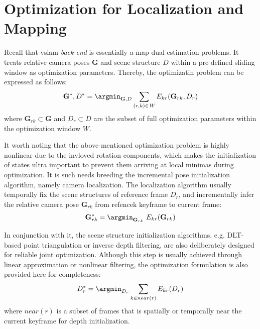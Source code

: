 \section{Optimization for Localization and Mapping}
\label{sec:preliminaries_locmap}
Recall that \acrshort{vslam} {\em back-end} is essentially a \acrshort{map} dual estimation problems. 
It treats relative camera poses $\mathbf{G}$ and scene structure $D$ within a pre-defined sliding window as optimization parameters.
Thereby, the optimizatin problem can be expressed as follows:
\begin{equation} \label{eq:preliminaries_mappingoptimization}
\mathbf{G}^*, D^* = \argmin_{\mathbf{G}, D} \sum_{(r,k)\in \mathit{W}} E_{kr}(\mathbf{G}_{rk}, D_r)
\end{equation} 
where $\mathbf{G}_{rk} \subset \mathbf{G}$ and $D_r \subset D$ are the subset of full optimization parameters within the optimization window $\mathit{W}$.

It worth noting that the above-mentioned optimization problem is highly nonlinear due to the invloved rotation components, which makes the initialization of states ultra important to prevent them arriving at local minimas during optimization.
It is such needs breeding the incremental pose initialization algorithm, namely camera localization.
The localization algorithm usually temporally fix the scene structures of reference frame $D_r$, and incrementally infer the relative camera pose $\mathbf{G}_{rk}$ from refencek keyframe to current frame:
\begin{equation} \label{eq:preliminaries_locoptimization}
\mathbf{G}_{rk}^* = \argmin_{\mathbf{G}_{rk}} \ E_{kr}(\mathbf{G}_{rk})
\end{equation} 

In conjunction with it, the scene structure initialization algorithms, e.g. DLT-based point triangulation or inverse depth filtering, are also deliberately designed for reliable joint optimization.
Although this step is usually achieved through linear approximation or nonlinear filtering, the optimization formulation is also provided here for completeness:
\begin{equation} \label{eq:preliminaries_dualoptimization}
D_{r}^* = \argmin_{D_{r}} \sum_{k \in near(r)} E_{kr}(D_{r})
\end{equation} 
where $near(r)$ is a subset of frames that is spatially or temporally near the current keyframe for depth initialization. 
